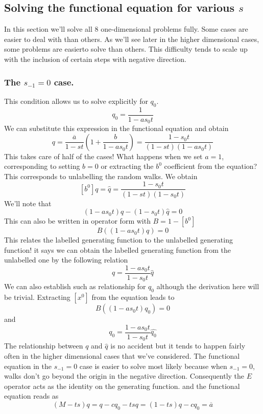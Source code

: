 \documentclass[12pt]{article}
\theoremstyle{definition} \newtheorem{definition}[theorem]{Definition}
\newcommand{\ol}[1]{\overline{#1}}
\newcommand{\wh}{\widehat}
\begin{document}
\subsection{Solving the functional equation for various $s$}
In this section we'll solve all 8 one-dimensional problems fully. Some cases are easier to deal with than others. As we'll see later in the higher dimensional cases, some problems are easierto solve than others. This difficulty tends to scale up with the inclusion of certain steps with negative direction.
\subsubsection{The $s_{-1} = 0$ case.}
This condition allows us to solve explicitly for $q_0$.
\[
	q_0 = \frac{1}{1-as_0t}
\]
We can substitute this expression in the functional equation and obtain
\[
	q =\frac{\ol{a}}{1-st}\left(1 + \frac{b}{{1-as_0t}}\right) = \frac{1-s_0t}{(1-st)(1-as_0t)}
\]
This takes care of half of the cases! What happens when we set $a = 1$, corresponding to setting $b =0$ or extracting the $b^0$ coefficient from the equation? This corresponds to unlabelling the random walks. We obtain
\[
	[b^0]q = \wh{q} =  \frac{1-s_0t}{(1-st)(1-s_0t)}
\]
We'll note that
\[
	(1-as_0t)q-(1-s_0t)\wh{q} = 0
\]
This can also be written in operator form with $B = 1 - [b^0]$
\[
	B((1-as_0t)q) = 0
\]
This relates the labelled generating function to the unlabelled generating function! it says we can obtain the labelled generating function from the unlabelled one by the following relation
\[
	q = \frac{1-as_0t}{1-s_0t}\wh{q}
\]
We can also establish such as relationship for $q_0$ although the derivation here will be trivial. Extracting $[x^0]$ from the equation leads to
\[
	B((1-as_0t)q_0) = 0
\]
and
\[
	q_0 = \frac{1-as_0t}{1-s_0t}\wh{q_0}
\]
The relationship between $q$ and $\wh q$ is no accident but it tends to happen fairly often in the higher dimensional cases that we've considered. The functional equation in the $s_{-1} = 0$ case is easier to solve most likely because when $s_{-1} = 0$, walks don't go beyond the origin in the negative direction. Consequently the $E$ operator acts as the identity on the generating function. and the functional equation reads as
\[
   (M-ts)q = q- cq_0 - tsq = (1-ts)q - c q_0 = \ol{a}
\]
\end{document}
